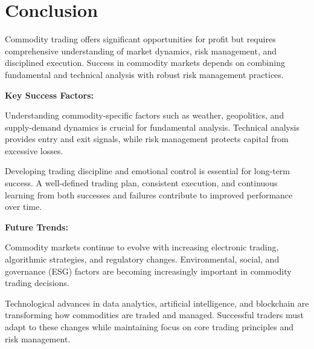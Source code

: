 \documentclass[12pt]{article}
\begin{document}
\section{Conclusion}

Commodity trading offers significant opportunities for profit but requires comprehensive understanding of market dynamics, risk management, and disciplined execution. Success in commodity markets depends on combining fundamental and technical analysis with robust risk management practices.

\textbf{Key Success Factors:}

Understanding commodity-specific factors such as weather, geopolitics, and supply-demand dynamics is crucial for fundamental analysis. Technical analysis provides entry and exit signals, while risk management protects capital from excessive losses.

Developing trading discipline and emotional control is essential for long-term success. A well-defined trading plan, consistent execution, and continuous learning from both successes and failures contribute to improved performance over time.

\textbf{Future Trends:}

Commodity markets continue to evolve with increasing electronic trading, algorithmic strategies, and regulatory changes. Environmental, social, and governance (ESG) factors are becoming increasingly important in commodity trading decisions.

Technological advances in data analytics, artificial intelligence, and blockchain are transforming how commodities are traded and managed. Successful traders must adapt to these changes while maintaining focus on core trading principles and risk management.
\end{document}
